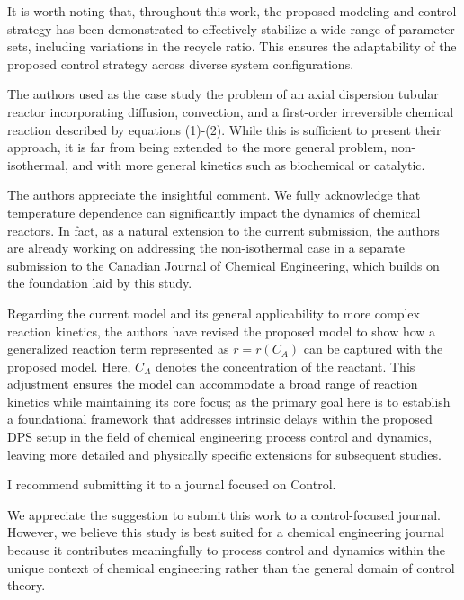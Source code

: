 \documentclass[12pt,answers]{exam}
\begin{document}
\begin{questions}
\begin{solutionorbox}
        It is worth noting that, throughout this work, the proposed modeling and control strategy has been demonstrated to effectively stabilize a wide range of parameter sets, including variations in the recycle ratio. This ensures the adaptability of the proposed control strategy across diverse system configurations.
    \end{solutionorbox}

    
    \question The authors used as the case study the problem of an axial dispersion tubular reactor incorporating diffusion, convection, and a first-order irreversible chemical reaction described by equations (1)-(2). While this is sufficient to present their approach, it is far from being extended to the more general problem, non-isothermal, and with more general kinetics such as biochemical or catalytic.

    \begin{solutionorbox} \label{comment:2_3}
        The authors appreciate the insightful comment. We fully acknowledge that temperature dependence can significantly impact the dynamics of chemical reactors. In fact, as a natural extension to the current submission, the authors are already working on addressing the non-isothermal case in a separate submission to the Canadian Journal of Chemical Engineering, which builds on the foundation laid by this study.

        Regarding the current model and its general applicability to more complex reaction kinetics, the authors have revised the proposed model to show how a generalized reaction term represented as \( r = r(C_A) \) can be captured with the proposed model. Here, \( C_A \) denotes the concentration of the reactant. This adjustment ensures the model can accommodate a broad range of reaction kinetics while maintaining its core focus; as the primary goal here is to establish a foundational framework that addresses intrinsic delays within the proposed DPS setup in the field of chemical engineering process control and dynamics, leaving more detailed and physically specific extensions for subsequent studies.        
    \end{solutionorbox}


    \question I recommend submitting it to a journal focused on Control.

    \begin{solutionorbox} \label{comment:2_4}
        We appreciate the suggestion to submit this work to a control-focused journal. However, we believe this study is best suited for a chemical engineering journal because it contributes meaningfully to process control and dynamics within the unique context of chemical engineering rather than the general domain of control theory.


\end{solutionorbox}
\end{questions}
\end{document}
